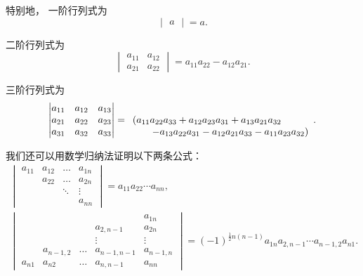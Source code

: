 特别地，
一阶行列式为
\begin{equation}
	\begin{vmatrix} a \end{vmatrix} = a.
\end{equation}

二阶行列式为
\begin{equation}
	\begin{vmatrix}
		a_{11} & a_{12} \\
		a_{21} & a_{22}
	\end{vmatrix}
	= a_{11} a_{22} - a_{12} a_{21}.
\end{equation}

三阶行列式为
\begin{equation}
	\begin{vmatrix}
		a_{11} & a_{12} & a_{13} \\
		a_{21} & a_{22} & a_{23} \\
		a_{31} & a_{32} & a_{33}
	\end{vmatrix}
	= \begin{array}[t]{l}
		(a_{11} a_{22} a_{33} + a_{12} a_{23} a_{31} + a_{13} a_{21} a_{32} \\
		\hspace{20pt}
		- a_{13} a_{22} a_{31} - a_{12} a_{21} a_{33} - a_{11} a_{23} a_{32})
	\end{array}.
\end{equation}

我们还可以用数学归纳法证明以下两条公式：
\begin{gather}
	\begin{vmatrix}
		a_{11} & a_{12} & \dots & a_{1n} \\
		& a_{22} & \dots & a_{2n} \\
		& & \ddots & \vdots \\
		& & & a_{nn}
	\end{vmatrix}
	= a_{11} a_{22} \dotsm a_{nn}, \\%
	\begin{vmatrix}
		& & & & a_{1n} \\
		& & & a_{2,n-1} & a_{2n} \\
		& & & \vdots & \vdots \\
		& a_{n-1,2} & \dots & a_{n-1,n-1} & a_{n-1,n} \\
		a_{n1} & a_{n2} & \dots & a_{n,n-1} & a_{nn}
	\end{vmatrix}
	=(-1)^{\frac{1}{2}n(n-1)} a_{1n} a_{2,n-1} \dotsm a_{n-1,2} a_{n1}.
\end{gather}

